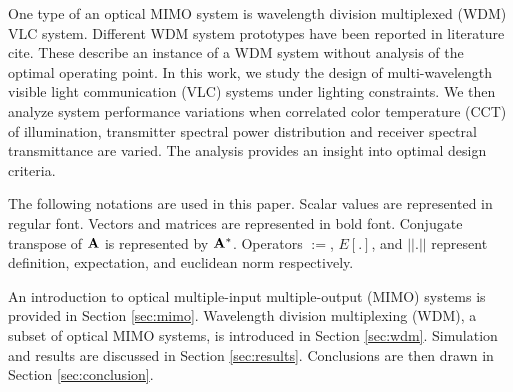 One type of an optical MIMO system is wavelength division multiplexed (WDM) VLC system. Different WDM system prototypes have been reported in literature {\color{red}cite}. These describe an instance of a WDM system without analysis of the optimal operating point. In this work, we study the design of multi-wavelength visible light communication (VLC) systems under lighting constraints. We then analyze system performance variations when correlated color temperature (CCT) of illumination, transmitter spectral power distribution and receiver spectral transmittance are varied. The analysis provides an insight into optimal design criteria.

The following notations are used in this paper. Scalar values are represented in regular font. Vectors and matrices are represented in bold font. Conjugate transpose of ${\bf{A}}$ is represented by ${\bf{A}}^{*}$. Operators $:=$, $E[.]$, and $||.||$ represent definition, expectation, and euclidean norm respectively. 

An introduction to optical multiple-input multiple-output (MIMO) systems is provided in Section \ref{sec:mimo}. Wavelength division multiplexing (WDM), a subset of optical MIMO systems, is introduced in Section \ref{sec:wdm}. Simulation and results are discussed in Section \ref{sec:results}. Conclusions are then drawn in Section \ref{sec:conclusion}. 